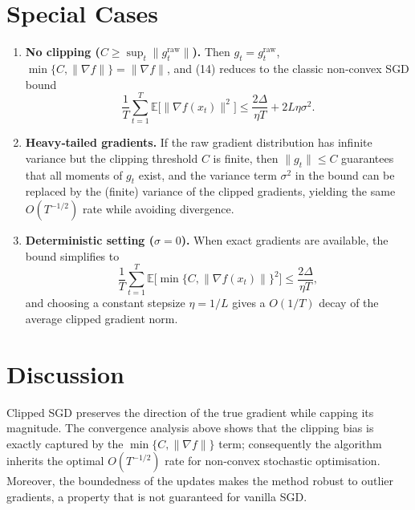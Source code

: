 \documentclass{article}
\begin{document}
\section*{Special Cases}
\begin{enumerate}[leftmargin=*]
\item \textbf{No clipping ($C\ge \sup_t\|g_t^{\text{raw}}\|$).}
Then $g_t=g_t^{\text{raw}}$, $\min\{C,\|\nabla f\|\}=\|\nabla f\|$, and (14) reduces
to the classic non‑convex SGD bound
\[
\frac{1}{T}\sum_{t=1}^{T}\mathbb{E}\bigl[\|\nabla f(x_t)\|^2\bigr]
\le
\frac{2\Delta}{\eta T}+2L\eta\sigma^2 .
\]

\item \textbf{Heavy‑tailed gradients.}
If the raw gradient distribution has infinite variance but the clipping
threshold $C$ is finite, then $\|g_t\|\le C$ guarantees that all moments of
$g_t$ exist, and the variance term $\sigma^2$ in the bound can be replaced by
the (finite) variance of the clipped gradients, yielding the same $O(T^{-1/2})$
rate while avoiding divergence.

\item \textbf{Deterministic setting ($\sigma=0$).}
When exact gradients are available, the bound simplifies to
\[
\frac{1}{T}\sum_{t=1}^{T}
\mathbb{E}\!\bigl[\min\{C,\|\nabla f(x_t)\|\}^2\bigr]
\le
\frac{2\Delta}{\eta T},
\]
and choosing a constant stepsize $\eta=1/L$ gives a $O(1/T)$ decay of the
average clipped gradient norm.
\end{enumerate}

\section*{Discussion}
Clipped SGD preserves the direction of the true gradient while capping its
magnitude. The convergence analysis above shows that the clipping bias is
exactly captured by the $\min\{C,\|\nabla f\|\}$ term; consequently the algorithm
inherits the optimal $O(T^{-1/2})$ rate for non‑convex stochastic optimisation.
Moreover, the boundedness of the updates makes the method robust to outlier
gradients, a property that is not guaranteed for vanilla SGD.
\end{document}
